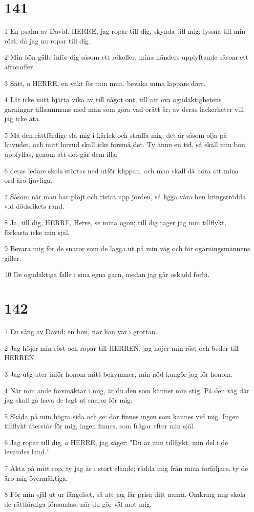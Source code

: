 \chapter{141}

\par 1 En psalm av David. HERRE, jag ropar till dig, skynda till mig; lyssna till min röst, då jag nu ropar till dig.
\par 2 Min bön gälle inför dig såsom ett rökoffer, mina händers upplyftande såsom ett aftonoffer.
\par 3 Sätt, o HERRE, en vakt för min mun, bevaka mina läppars dörr.
\par 4 Låt icke mitt hjärta vika av till något ont, till att öva ogudaktighetens gärningar tillsammans med män som göra vad orätt är; av deras läckerheter vill jag icke äta.
\par 5 Må den rättfärdige slå mig i kärlek och straffa mig; det är såsom olja på huvudet, och mitt huvud skall icke försmå det. Ty ännu en tid, så skall min bön uppfyllas, genom att det går dem illa;
\par 6 deras ledare skola störtas ned utför klippan, och man skall då höra att mina ord äro ljuvliga.
\par 7 Såsom när man har plöjt och ristat upp jorden, så ligga våra ben kringströdda vid dödsrikets rand.
\par 8 Ja, till dig, HERRE, Herre, se mina ögon; till dig tager jag min tillflykt, förkasta icke min själ.
\par 9 Bevara mig för de snaror som de lägga ut på min väg och för ogärningsmännens giller.
\par 10 De ogudaktiga falle i sina egna garn, medan jag går oskadd förbi.

\chapter{142}

\par 1 En sång av David; en bön, när han var i grottan.
\par 2 Jag höjer min röst och ropar till HERREN, jag höjer min röst och beder till HERREN.
\par 3 Jag utgjuter inför honom mitt bekymmer, min nöd kungör jag för honom.
\par 4 När min ande försmäktar i mig, är du den som känner min stig. På den väg där jag skall gå hava de lagt ut snaror för mig.
\par 5 Skåda på min högra sida och se: där finnes ingen som kännes vid mig. Ingen tillflykt återstår för mig, ingen finnes, som frågar efter min själ.
\par 6 Jag ropar till dig, o HERRE, jag säger: "Du är min tillflykt, min del i de levandes land."
\par 7 Akta på mitt rop, ty jag är i stort elände; rädda mig från mina förföljare, ty de äro mig övermäktiga.
\par 8 För min själ ut ur fängelset, så att jag får prisa ditt namn. Omkring mig skola de rättfärdiga församlas, när du gör väl mot mig.


